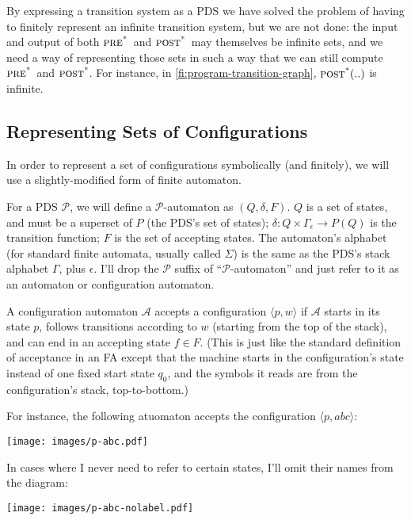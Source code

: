 \documentclass{article}
\newcommand{\Config}[2]{\ensuremath{\langle #1, #2 \rangle}}
\newcommand{\powerset}[1]{P(#1)}
\newcommand{\poststar}{\ensuremath{\textsc{post}^\textsc{*}}}
\newcommand{\prestar}{\ensuremath{\textsc{pre}^\textsc{*}}}
\begin{document}
By expressing a transition system as a PDS we have solved the problem
of having to finitely represent an infinite transition system, but we
are not done: the input and output of both \prestar\ and
\poststar\ may themselves be infinite sets, and we need a way of
representing those sets in such a way that we can still compute
\prestar\ and \poststar. For instance, in
\cref{fi:program-transition-graph}, $\poststar(..)$ is infinite.

\subsection{Representing Sets of Configurations}

In order to represent a set of configurations symbolically (and
finitely), we will use a slightly-modified form of finite
automaton.

For a PDS $\mathcal{P}$, we will define a $\mathcal{P}$-automaton as
$(Q, \delta, F)$. $Q$ is a set of states, and must be a superset of
$P$ (the PDS's set of states); $\delta: Q \times \Gamma_\epsilon
\rightarrow \powerset{Q}$ is the transition function; $F$ is the set
of accepting states. The automaton's alphabet (for standard finite
automata, usually called $\Sigma$) is the same as the PDS's stack
alphabet $\Gamma$, plus $\epsilon$. I'll drop the $\mathcal{P}$
suffix of ``$\mathcal{P}$-automaton'' and just refer to it as an
automaton or configuration automaton.

A configuration automaton $\mathcal{A}$ accepts a configuration
\Config{p}{w} if $\mathcal{A}$ starts in its state $p$, follows
transitions according to $w$ (starting from the top of the stack), and
can end in an accepting state $f \in F$. (This is just like the
standard definition of acceptance in an FA except that the machine
starts in the configuration's state instead of one fixed start state
$q_0$, and the symbols it reads are from the configuration's stack,
top-to-bottom.)

For instance, the following atuomaton accepts the configuration
\Config{p}{abc}:\\
\begin{center}
  \texttt{[image: images/p-abc.pdf]}
\end{center}

In cases where I never need to refer to certain states, I'll omit
their names from the diagram:\\
\begin{center}
  \texttt{[image: images/p-abc-nolabel.pdf]}
\end{center}
\end{document}
